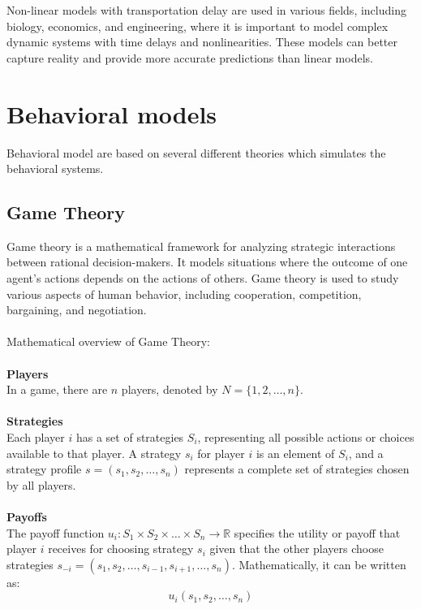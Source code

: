 \documentclass[12pt]{article}
\begin{document}
\noindent Non-linear models with transportation delay are used in various fields,
including biology, economics, and engineering, where it is important to
model complex dynamic systems with time delays and nonlinearities. 
These models can better capture reality and provide more accurate
predictions than linear models.

\section{Behavioral models}
Behavioral model are based on several different theories which
simulates the behavioral systems.\\
\subsection{Game Theory}\label{gt}
Game theory is a mathematical framework for analyzing strategic
interactions between rational decision-makers. It models situations where
the outcome of one agent's actions depends on the actions of others.
Game theory is used to study various aspects of human behavior, including
cooperation, competition, bargaining, and negotiation.\\
\\
Mathematical overview of Game Theory:\\
\\
\textbf{Players}\\
In a game, there are \(n\) players, denoted by \(N = \{1, 2, \ldots, n\}\).\\
\\
\textbf{Strategies}\\
Each player \(i\) has a set of strategies \(S_i\), representing all possible actions or choices available to that player. A strategy \(s_i\) for player \(i\) is an element of \(S_i\), and a strategy profile \(s = (s_1, s_2, \ldots, s_n)\) represents a complete set of strategies chosen by all players.\\
\\
\textbf{Payoffs}\\
The payoff function \(u_i : S_1 \times S_2 \times \ldots \times S_n \rightarrow \mathbb{R}\) specifies the utility or payoff that player \(i\) receives for choosing strategy \(s_i\) given that the other players choose strategies \(s_{-i} = (s_1, s_2, \ldots, s_{i-1}, s_{i+1}, \ldots, s_n)\). Mathematically, it can be written as:\\
\begin{equation}
    u_i(s_1, s_2, \ldots, s_n)
\end{equation}
\end{document}

